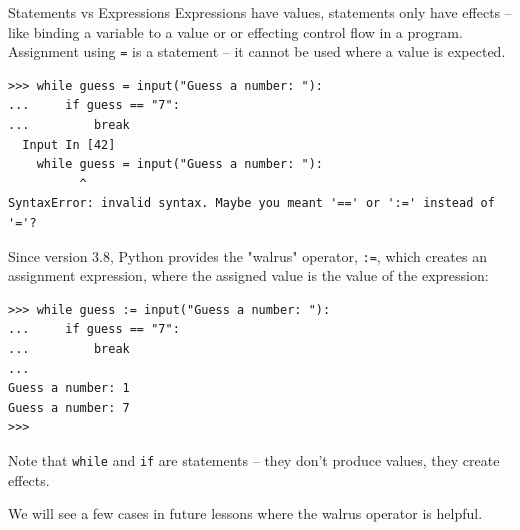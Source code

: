 \documentclass[smaller, aspectratio=1610]{beamer}
\begin{document}
\begin{frame}[label={sec:org7b08dd1},fragile]{Statements vs Expressions}
 Expressions have values, statements only have effects -- like binding a variable to a value or or effecting control flow in a program. Assignment using \texttt{=} is a statement -- it cannot be used where a value is expected.

\lstset{language=Python,label= ,caption= ,captionpos=b,numbers=none}
\begin{lstlisting}
>>> while guess = input("Guess a number: "):
...     if guess == "7":
...         break
  Input In [42]
    while guess = input("Guess a number: "):
          ^
SyntaxError: invalid syntax. Maybe you meant '==' or ':=' instead of '='?
\end{lstlisting}

Since version 3.8, Python provides the "walrus" operator, \texttt{:=}, which creates an assignment expression, where the assigned value is the value of the expression:

\lstset{language=Python,label= ,caption= ,captionpos=b,numbers=none}
\begin{lstlisting}
>>> while guess := input("Guess a number: "):
...     if guess == "7":
...         break
...
Guess a number: 1
Guess a number: 7
>>>
\end{lstlisting}

Note that \texttt{while} and \texttt{if} are statements -- they don't produce values, they create effects.

We will see a few cases in future lessons where the walrus operator is helpful.
\end{frame}
\end{document}
